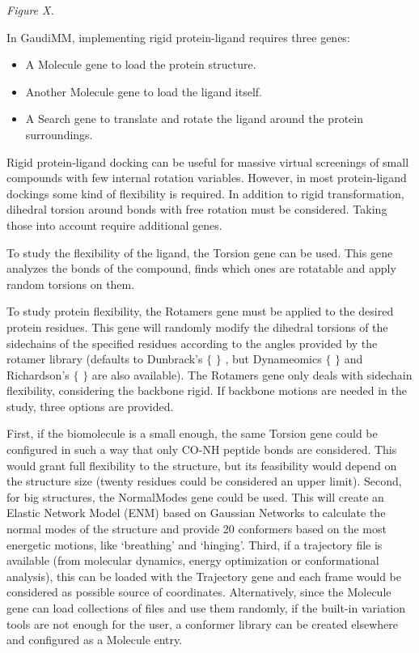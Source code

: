 \begin{Center}
\textit{Figure X. }
\end{Center}

In GaudiMM, implementing rigid protein-ligand requires three genes:

\begin{itemize}
	\item A Molecule gene to load the protein structure.

	\item Another Molecule gene to load the ligand itself.

	\item A Search gene to translate and rotate the ligand around the protein surroundings.
\end{itemize}

Rigid protein-ligand docking can be useful for massive virtual screenings of small compounds with few internal rotation variables. However, in most protein-ligand dockings some kind of flexibility is required. In addition to rigid transformation, dihedral torsion around bonds with free rotation must be considered. Taking those into account require additional genes.

To study the flexibility of the ligand, the Torsion gene can be used. This gene analyzes the bonds of the compound, finds which ones are rotatable and apply random torsions on them.

To study protein flexibility, the Rotamers gene must be applied to the desired protein residues. This gene will randomly modify the dihedral torsions of the sidechains of the specified residues according to the angles provided by the rotamer library (defaults to Dunbrack’s $ \{ $ $ \} $ , but Dynameomics $ \{ $ $ \} $  and Richardson’s $ \{ $ $ \} $  are also available). The Rotamers gene only deals with sidechain flexibility, considering the backbone rigid. If backbone motions are needed in the study, three options are provided.

First, if the biomolecule is a small enough, the same Torsion gene could be configured in such a way that only CO-NH peptide bonds are considered. This would grant full flexibility to the structure, but its feasibility would depend on the structure size (twenty residues could be considered an upper limit). Second, for big structures, the NormalModes gene could be used. This will create an Elastic Network Model (ENM) based on Gaussian Networks to calculate the normal modes of the structure and provide 20 conformers based on the most energetic motions, like ‘breathing’ and ‘hinging’. Third, if a trajectory file is available (from molecular dynamics, energy optimization or conformational analysis), this can be loaded with the Trajectory gene and each frame would be considered as possible source of coordinates. Alternatively, since the Molecule gene can load collections of files and use them randomly, if the built-in variation tools are not enough for the user, a conformer library can be created elsewhere and configured as a Molecule entry.


